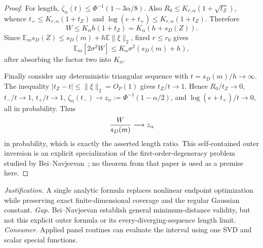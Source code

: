 \documentclass{article}
\begin{document}
\begin{proof}
For length, \(\zeta_\alpha(t)\le\Phi^{-1}(1-3\alpha/8)\).  Also \(R_0\le K_{r,\alpha}(1+\sqrt{t_Z})\), whence \(t_+\le K_{r,\alpha}(1+t_Z)\) and \(\log(e+t_+)\le K_{r,\alpha}(1+t_Z)\).  Therefore
\[
 W\le K_\alpha h(1+t_Z)=K_\alpha(h+s_D(Z)).
\]
Since \(\mathbb E_m s_D(Z)\le s_D(m)+h\mathbb E\|\xi\|_2\), fixed \(r\le r_0\) gives
\[
 \mathbb E_m[2\sigma^2W]\le K_\alpha\sigma^2(s_D(m)+h),
\]
after absorbing the factor two into \(K_\alpha\).

Finally consider any deterministic triangular sequence with \(t=s_D(m)/h\to\infty\).  The inequality \(|t_Z-t|\le\|\xi\|_2=O_P(1)\) gives \(t_Z/t\to1\).  Hence \(R_0/t_Z\to0\), \(t_-/t\to1\), \(t_+/t\to1\), \(\zeta_\alpha(t_-)\to z_\alpha:=\Phi^{-1}(1-\alpha/2)\), and \(\log(e+t_+)/t\to0\), all in probability.  Thus
\[
 {W\over s_D(m)}\longrightarrow z_\alpha
\]
in probability, which is exactly the asserted length ratio.  This self-contained outer inversion is an explicit specialization of the first-order-degeneracy problem studied by Bei--Navjeevan~\cite{BeiNavjeevan2026}; no theorem from that paper is used as a premise here.
\end{proof}
\par\smallskip\noindent \textit{Justification.} A single analytic formula replaces nonlinear endpoint optimization while preserving exact finite-dimensional coverage and the regular Gaussian constant. \textit{Gap.} Bei--Navjeevan establish general minimum-distance validity, but not this explicit outer formula or its every-diverging-sequence length limit. \textit{Consumer.} Applied panel routines can evaluate the interval using one SVD and scalar special functions.
\end{document}

